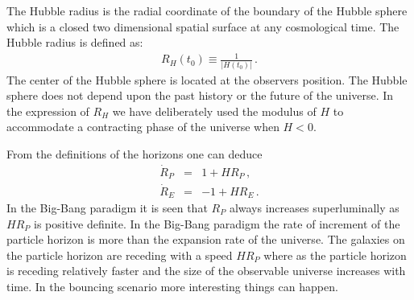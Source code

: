 \documentclass[24pt]{article}
\begin{document}
The Hubble radius is the radial coordinate of the boundary of the
Hubble sphere which is a closed two dimensional spatial surface at any
cosmological time. The Hubble radius is defined as:
\begin{eqnarray}
R_H(t_0) \equiv \frac{1}{|H(t_0)|}\,.
\label{hubs}
\end{eqnarray}
The center of the Hubble sphere is located at the observers
position. The Hubble sphere does not depend upon the past history or
the future of the universe. In the expression of $R_H$ we have
deliberately used the modulus of $H$ to accommodate a contracting
phase of the universe when $H<0$. 

From the definitions of the horizons one can deduce
\begin{eqnarray}
\dot{R}_P &=& 1 + H R_P\,,
\label{rpr}\\
\dot{R}_E &=& -1 + H R_E\,.
\label{rer}
\end{eqnarray}
In the Big-Bang paradigm it is seen that $R_P$ always increases
superluminally as $H R_P$ is positive definite. In the Big-Bang
paradigm the rate of increment of the particle horizon is more than
the expansion rate of the universe. The galaxies on the particle
horizon are receding with a speed $H R_P$ where as the particle
horizon is receding relatively faster and the size of the observable
universe increases with time. In the bouncing scenario more
interesting things can happen.
\end{document}
